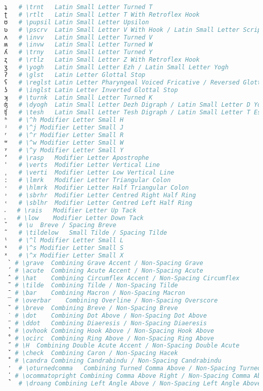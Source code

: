 \begin{lstlisting}[language=Julia, style=julia, linewidth=\textwidth]
ʇ   # \trnt   Latin Small Letter Turned T
ʈ   # \rtlt   Latin Small Letter T With Retroflex Hook
ʊ   # \pupsil Latin Small Letter Upsilon
ʋ   # \pscrv  Latin Small Letter V With Hook / Latin Small Letter Script V
ʌ   # \invv   Latin Small Letter Turned V
ʍ   # \invw   Latin Small Letter Turned W
ʎ   # \trny   Latin Small Letter Turned Y
ʐ   # \rtlz   Latin Small Letter Z With Retroflex Hook
ʒ   # \yogh   Latin Small Letter Ezh / Latin Small Letter Yogh
ʔ   # \glst   Latin Letter Glottal Stop
ʕ   # \reglst Latin Letter Pharyngeal Voiced Fricative / Reversed Glottal Stop
ʖ   # \inglst Latin Letter Inverted Glottal Stop
ʞ   # \turnk  Latin Small Letter Turned K
ʤ   # \dyogh  Latin Small Letter Dezh Digraph / Latin Small Letter D Yogh
ʧ   # \tesh   Latin Small Letter Tesh Digraph / Latin Small Letter T Esh
ʰ   # \^h Modifier Letter Small H
ʲ   # \^j Modifier Letter Small J
ʳ   # \^r Modifier Letter Small R
ʷ   # \^w Modifier Letter Small W
ʸ   # \^y Modifier Letter Small Y
ʼ   # \rasp   Modifier Letter Apostrophe
ˈ   # \verts  Modifier Letter Vertical Line
ˌ   # \verti  Modifier Letter Low Vertical Line
ː   # \lmrk   Modifier Letter Triangular Colon
ˑ   # \hlmrk  Modifier Letter Half Triangular Colon
˒   # \sbrhr  Modifier Letter Centred Right Half Ring
˓   # \sblhr  Modifier Letter Centred Left Half Ring
˔   # \rais   Modifier Letter Up Tack
˕   # \low    Modifier Letter Down Tack
˘   # \u  Breve / Spacing Breve
˜   # \tildelow   Small Tilde / Spacing Tilde
ˡ   # \^l Modifier Letter Small L
ˢ   # \^s Modifier Letter Small S
ˣ   # \^x Modifier Letter Small X
 ̀  # \grave  Combining Grave Accent / Non-Spacing Grave
 ́  # \acute  Combining Acute Accent / Non-Spacing Acute
 ̂  # \hat    Combining Circumflex Accent / Non-Spacing Circumflex
 ̃  # \tilde  Combining Tilde / Non-Spacing Tilde
 ̄  # \bar    Combining Macron / Non-Spacing Macron
 ̅  # \overbar    Combining Overline / Non-Spacing Overscore
 ̆  # \breve  Combining Breve / Non-Spacing Breve
 ̇  # \dot    Combining Dot Above / Non-Spacing Dot Above
 ̈  # \ddot   Combining Diaeresis / Non-Spacing Diaeresis
 ̉  # \ovhook Combining Hook Above / Non-Spacing Hook Above
 ̊  # \ocirc  Combining Ring Above / Non-Spacing Ring Above
 ̋  # \H  Combining Double Acute Accent / Non-Spacing Double Acute
 ̌  # \check  Combining Caron / Non-Spacing Hacek
 ̐  # \candra Combining Candrabindu / Non-Spacing Candrabindu
 ̒  # \oturnedcomma   Combining Turned Comma Above / Non-Spacing Turned Comma Above
 ̕  # \ocommatopright Combining Comma Above Right / Non-Spacing Comma Above Right
 ̚  # \droang Combining Left Angle Above / Non-Spacing Left Angle Above

\end{lstlisting}
